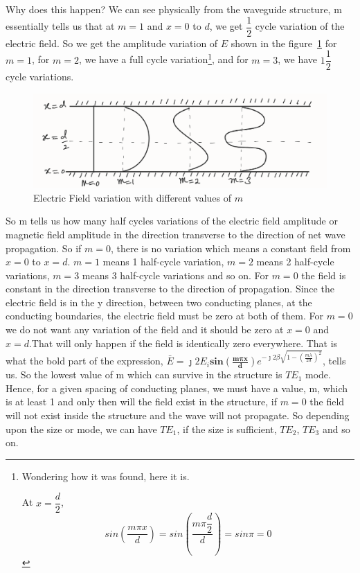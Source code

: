 Why does this happen? We can see physically from the waveguide structure, m essentially tells us that at $m=1$ and $x=0$ to $d$, we get $\dfrac{1}{2}$ cycle variation of the electric field. So we get the amplitude variation of $E$ shown in the figure~\ref{fig:lec35fig7} for $m=1$, for $m=2$, we have a full cycle variation\footnote{Wondering how it was found, here it is.

At $x=\dfrac{d}{2}$,
\begin{dmath*}
sin\left(\frac{m\pi x}{d}\right) = sin\left(\frac{m\pi \dfrac{d}{2}}{d}\right) = sin\pi = 0
\end{dmath*}}, and for $m=3$, we have $1\dfrac{1}{2}$ cycle variations. 
\begin{figure}[h]
\centering
\includegraphics[width=1\linewidth]{./graphics/lec35fig7}
\caption{Electric Field variation with different values of $m$}
\label{fig:lec35fig7}
\end{figure}

So m tells us how many half cycles variations of the electric field amplitude or magnetic field amplitude in the direction transverse to the direction of net wave propagation. So if $m=0$, there is no variation which means a constant field from $x=0$ to $x=d$. $m=1$ means 1 half-cycle variation, $m=2$ means 2 half-cycle variations, $m=3$ means 3 half-cycle variations and so on. For $m=0$ the field is constant in the direction transverse to the direction of propagation. Since the electric field is in the y direction, between two conducting planes, at the conducting boundaries, the electric field must be zero at both of them. For $m=0$ we do not want any variation of the field and it should be zero at $x=0$ and $x=d$.That will only happen if the field is identically zero everywhere. That is what the bold part of the expression, $\bar{E} = \jmath 2E_i\boldsymbol{sin\left(\frac{m\pi x}{d}\right)}e^{-\jmath 2\beta\sqrt{1 - \left(\frac{m\lambda}{2d}\right)^2}}$, tells us. So the lowest value of m which can survive in the structure is $TE_1$ mode. Hence, for a given spacing of conducting planes, we must have a value, m, which is at least 1 and only then will the field exist in the structure, if $m=0$ the field will not exist inside the structure and the wave will not propagate. So depending upon the size or mode, we can have $TE_1$, if the size is sufficient, $TE_2$, $TE_3$ and so on.

